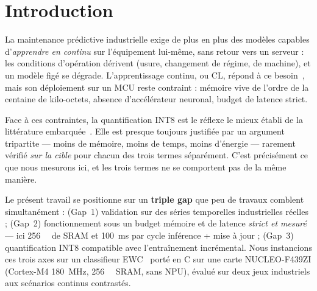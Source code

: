 \section{Introduction}
\label{sec:intro}

La maintenance prédictive industrielle exige de plus en plus des modèles capables d'\emph{apprendre en
continu} sur l'équipement lui-même, sans retour vers un serveur : les conditions d'opération dérivent
(usure, changement de régime, de machine), et un modèle figé se dégrade. L'apprentissage continu, ou \gls{CL}, répond à ce besoin~\cite{DeLange2021Survey,Hurtado2023CLPdM}, mais son
déploiement sur un \gls{MCU} reste contraint : mémoire vive de l'ordre de la centaine de
kilo-octets, absence d'accélérateur neuronal, budget de latence strict.

Face à ces contraintes, la quantification INT8 est le réflexe le mieux établi de la littérature
embarquée~\cite{Ravaglia2021QLRCL,Capogrosso2023TinyML}. Elle est presque toujours justifiée par un
argument tripartite --- moins de mémoire, moins de temps, moins d'énergie --- rarement vérifié
\emph{sur la cible} pour chacun des trois termes séparément. C'est précisément ce que nous mesurons ici, et
les trois termes ne se comportent pas de la même manière.

Le présent travail se positionne sur un \textbf{triple gap} que peu de travaux comblent simultanément :
(Gap~1) validation sur des séries temporelles industrielles réelles ; (Gap~2) fonctionnement sous un budget
mémoire et de latence \emph{strict et mesuré} --- ici \SI{256}{\kilo\byte} de \gls{SRAM} et
\SI{100}{\milli\second} par cycle inférence + mise à jour ; (Gap~3) quantification INT8 compatible avec
l'entraînement incrémental. Nous instancions ces trois axes sur un classifieur
\gls{EWC}~\cite{Kirkpatrick2017EWC} porté en C sur une carte NUCLEO-F439ZI (Cortex-M4 \SI{180}{\mega\hertz},
\SI{256}{\kilo\byte} SRAM, sans \gls{NPU}), évalué sur deux jeux industriels aux scénarios continus contrastés.


